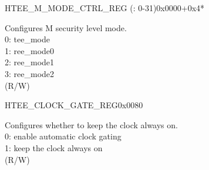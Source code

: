 \begin{register}{H}{TEE\_M\_MODE\_CTRL\_REG (: 0-31)}{0x0000+0x4*}\label{regdesc:TEEM0MODECTRLREG}
%
%
\regnewline%
\begin{regdesc}\begin{reglist}
\label{fielddesc:TEEM0MODE}\item [TEE\_M\regindex{n}\_MODE] Configures M security level mode.\\
0: tee\_mode \\
1: ree\_mode0 \\
2: ree\_mode1 \\
3: ree\_mode2  \\ (R/W)
\end{reglist}\end{regdesc}
\end{register}


































































\begin{register}{H}{TEE\_CLOCK\_GATE\_REG}{0x0080}\label{regdesc:TEECLOCKGATEREG}
%
%
\regnewline%
\begin{regdesc}\begin{reglist}
\label{fielddesc:TEECLKEN}\item [TEE\_CLK\_EN] Configures whether to keep the clock always on.\\
0: enable automatic clock gating \\
1: keep the clock always on  \\ (R/W)
\end{reglist}\end{regdesc}
\end{register}


